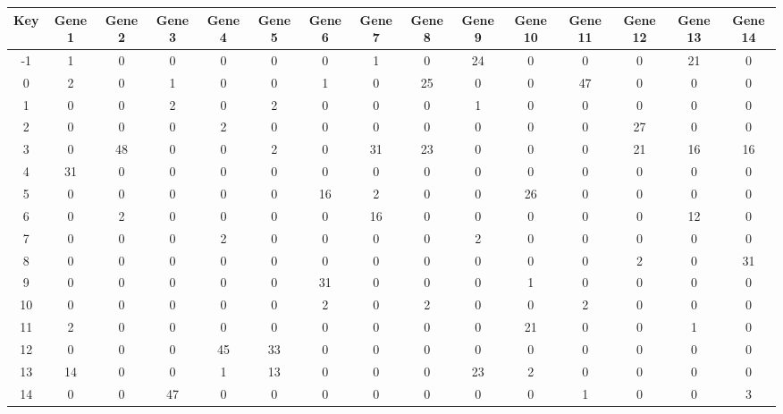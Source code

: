 \begin{tabular}{|c|c|c|c|c|c|c|c|c|c|c|c|c|c|c|}
\hline
Key & Gene 1 & Gene 2 & Gene 3 & Gene 4 & Gene 5 & Gene 6 & Gene 7 & Gene 8 & Gene 9 & Gene 10 & Gene 11 & Gene 12 & Gene 13 & Gene 14 \\
\hline
-1 & 1 & 0 & 0 & 0 & 0 & 0 & 1 & 0 & 24 & 0 & 0 & 0 & 21 & 0 \\
0 & 2 & 0 & 1 & 0 & 0 & 1 & 0 & 25 & 0 & 0 & 47 & 0 & 0 & 0 \\
1 & 0 & 0 & 2 & 0 & 2 & 0 & 0 & 0 & 1 & 0 & 0 & 0 & 0 & 0 \\
2 & 0 & 0 & 0 & 2 & 0 & 0 & 0 & 0 & 0 & 0 & 0 & 27 & 0 & 0 \\
3 & 0 & 48 & 0 & 0 & 2 & 0 & 31 & 23 & 0 & 0 & 0 & 21 & 16 & 16 \\
4 & 31 & 0 & 0 & 0 & 0 & 0 & 0 & 0 & 0 & 0 & 0 & 0 & 0 & 0 \\
5 & 0 & 0 & 0 & 0 & 0 & 16 & 2 & 0 & 0 & 26 & 0 & 0 & 0 & 0 \\
6 & 0 & 2 & 0 & 0 & 0 & 0 & 16 & 0 & 0 & 0 & 0 & 0 & 12 & 0 \\
7 & 0 & 0 & 0 & 2 & 0 & 0 & 0 & 0 & 2 & 0 & 0 & 0 & 0 & 0 \\
8 & 0 & 0 & 0 & 0 & 0 & 0 & 0 & 0 & 0 & 0 & 0 & 2 & 0 & 31 \\
9 & 0 & 0 & 0 & 0 & 0 & 31 & 0 & 0 & 0 & 1 & 0 & 0 & 0 & 0 \\
10 & 0 & 0 & 0 & 0 & 0 & 2 & 0 & 2 & 0 & 0 & 2 & 0 & 0 & 0 \\
11 & 2 & 0 & 0 & 0 & 0 & 0 & 0 & 0 & 0 & 21 & 0 & 0 & 1 & 0 \\
12 & 0 & 0 & 0 & 45 & 33 & 0 & 0 & 0 & 0 & 0 & 0 & 0 & 0 & 0 \\
13 & 14 & 0 & 0 & 1 & 13 & 0 & 0 & 0 & 23 & 2 & 0 & 0 & 0 & 0 \\
14 & 0 & 0 & 47 & 0 & 0 & 0 & 0 & 0 & 0 & 0 & 1 & 0 & 0 & 3 \\
\hline
\end{tabular}